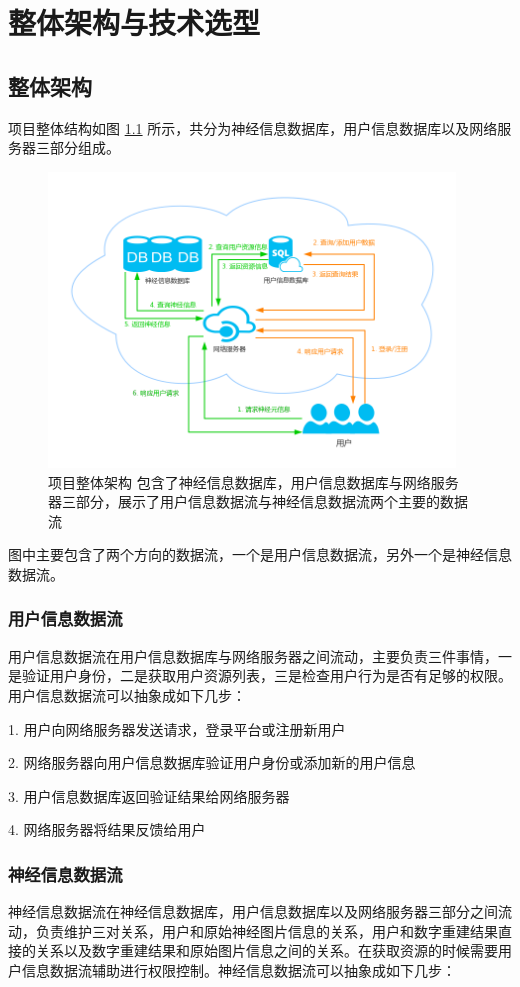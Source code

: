 \chapter{整体架构与技术选型}

\section{整体架构}
项目整体结构如图 \ref{server} 所示，共分为神经信息数据库，用户信息数据库以及网络服务器三部分组成。
\begin{figure}
\centering
\includegraphics[width=108mm]{images/server}
\caption{项目整体架构 包含了神经信息数据库，用户信息数据库与网络服务器三部分，展示了用户信息数据流与神经信息数据流两个主要的数据流}
\label{server}
\end{figure}
图中主要包含了两个方向的数据流，一个是用户信息数据流，另外一个是神经信息数据流。

\subsection{用户信息数据流}
用户信息数据流在用户信息数据库与网络服务器之间流动，主要负责三件事情，一是验证用户身份，二是获取用户资源列表，三是检查用户行为是否有足够的权限。用户信息数据流可以抽象成如下几步：

1. 用户向网络服务器发送请求，登录平台或注册新用户

2. 网络服务器向用户信息数据库验证用户身份或添加新的用户信息

3. 用户信息数据库返回验证结果给网络服务器

4. 网络服务器将结果反馈给用户

\subsection{神经信息数据流}
神经信息数据流在神经信息数据库，用户信息数据库以及网络服务器三部分之间流动，负责维护三对关系，用户和原始神经图片信息的关系，用户和数字重建结果直接的关系以及数字重建结果和原始图片信息之间的关系。在获取资源的时候需要用户信息数据流辅助进行权限控制。神经信息数据流可以抽象成如下几步：

